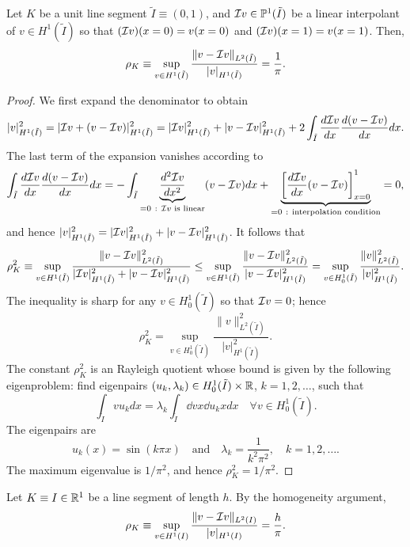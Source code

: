 \begin{proposition}
Let $K$ be a unit line segment $\tilde I \equiv (0,1)$, and $\mathcal{I} v \in \mathbb{P}^1(\tilde I)$ be a linear interpolant of $v \in H^1(\tilde I)$ so that $(\mathcal{I} v)(x=0) = v(x=0)$ and $(\mathcal{I} v)(x=1) = v(x=1)$.  Then,
\begin{equation*}
  \rho_K \equiv \sup_{v \in H^1(\tilde I)} \frac{\| v - \mathcal{I} v \|_{L^2(\tilde I)}}{| v |_{H^1(\tilde I)}} = \frac{1}{\pi}.
\end{equation*}
\begin{proof}
  We first expand the denominator to obtain
  \begin{equation*}
    | v |_{H^1(\tilde I)}^2
    = | \mathcal{I} v + (v - \mathcal{I} v) |_{H^1(\tilde I)}^2
    =  | \mathcal{I} v |_{H^1(\tilde I)}^2 +  | v - \mathcal{I} v |_{H^1(\tilde I)}^2 + 2 \int_{\tilde I} \frac{d \mathcal{I} v}{d x} \frac{d (v - \mathcal{I} v)}{d x} dx .
  \end{equation*}
  The last term of the expansion vanishes according to
  \begin{equation*}
    \int_{\tilde I} \dd{\calI v}{x} \dd{(v - \calI v)}{x} dx
    =
    - \int_{\tilde I} \underbrace{\dd{^2 \calI v}{x^2}}_{=0\ :\ \text{$\calI v$ is linear}} (v - \calI v) dx
    + \underbrace{\left[ \dd{\calI v}{x} (v - \calI v) \right]_{x=0}^1}_{=0\ :\ \text{interpolation condition}} = 0,
  \end{equation*}
  and hence $ | v |_{H^1(\tilde I)}^2 =  | \mathcal{I} v |_{H^1(\tilde I)}^2 +  | v - \mathcal{I} v |_{H^1(\tilde I)}^2 $.  It follows that
  \begin{equation*} 
    \rho_K^2
    \equiv \sup_{v \in H^1(\tilde I)} \frac{\| v - \mathcal{I} v \|^2_{L^2(\tilde I)}}{| \mathcal{I} v |_{H^1(\tilde I)}^2 +  | v - \mathcal{I} v |_{H^1(\tilde I)}^2}
    \leq  \sup_{v \in H^1(\tilde I)} \frac{\| v - \mathcal{I} v \|^2_{L^2(\tilde I)}}{| v - \mathcal{I} v |_{H^1(\tilde I)}^2}
    =\sup_{v \in H^1_0(\tilde I)} \frac{\| v \|^2_{L^2(\tilde I)}}{| v |_{H^1(\tilde I)}^2}.
  \end{equation*}
  The inequality is sharp for any $v \in H^1_0(\tilde I)$ so that $\mathcal{I} v = 0$; hence
   \begin{equation*} 
     \rho_K^2 =\sup_{v \in H^1_0(\tilde I)} \frac{\| v \|^2_{L^2(\tilde I)}}{| v |_{H^1(\tilde I)}^2}.
  \end{equation*}
  The constant $\rho_K^2$ is an Rayleigh quotient whose bound is given by the following eigenproblem: find eigenpairs $(u_k,\lambda_k) \in H^1_0(\tilde I) \times \mathbb{R}$, $k = 1,2,\dots$, such that
  \begin{equation*}
    \int_{\tilde I} v u_k dx = \lambda_k \int_{\tilde I} \dd{v}{x} \dd{u_k}{x} dx \quad \forall v \in H^1_0(\tilde I).
  \end{equation*}
  The eigenpairs are
  \begin{equation*}
    u_k(x) = \sin(k\pi x) \quad \text{and} \quad \lambda_k = \frac{1}{k^2\pi^2}, \quad k = 1,2,\dots.
  \end{equation*}
  The maximum eigenvalue is $1/\pi^2$, and hence $\rho_K^2 = 1/\pi^2$.
\end{proof}
\end{proposition}
\begin{corollary}
  Let $K \equiv I \in \mathbb{R}^1$ be a line segment of length $h$. By the homogeneity argument,
  \begin{equation*}
    \rho_K \equiv \sup_{v \in H^1(I)} \frac{\| v - \mathcal{I} v \|_{L^2(I)}}{| v |_{H^1(I)}} = \frac{h}{\pi}.
  \end{equation*}
\end{corollary}

